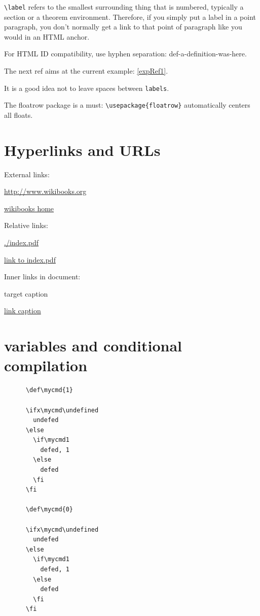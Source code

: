 \documentclass[12pt]{article}
\begin{document}
  \lstinline|\label| refers to the smallest surrounding thing that is numbered,
  typically a section or a theorem environment.
  Therefore, if you simply put a label in a point paragraph,
  you don't normally get a link to that point of paragraph like you would in an HTML anchor.

  For HTML ID compatibility, use hyphen separation: def-a-definition-was-here.

  \begin{example} \label{expRef1}
    The next ref aims at the current example: \ref{expRef1}.
  \end{example}

  It is a good idea not to leave spaces between \lstinline|labels|.

  The floatrow package is a must: \lstinline|\usepackage{floatrow}| automatically centers all floats.

\section{Hyperlinks and URLs}\label{hyperlinks-urls}

  External links:

  \url{http://www.wikibooks.org}

  \href{http://www.wikibooks.org}{wikibooks home}

  Relative links:

  \url{./index.pdf}

  \href{./index.pdf}{link to index.pdf}

  Inner links in document:

  \hypertarget{label}{target caption}

  \hyperlink{label}{link caption}

  \section{variables and conditional compilation}

    \begin{lstlisting}
      \def\mycmd{1}

      \ifx\mycmd\undefined
        undefed
      \else
        \if\mycmd1
          defed, 1
        \else
          defed
        \fi
      \fi

      \def\mycmd{0}

      \ifx\mycmd\undefined
        undefed
      \else
        \if\mycmd1
          defed, 1
        \else
          defed
        \fi
      \fi
    \end{lstlisting}
\end{document}
